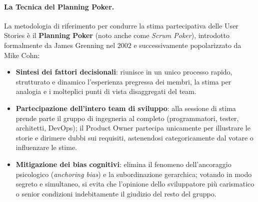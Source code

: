 \documentclass[12pt]{extarticle}
\begin{document}
\paragraph{La Tecnica del Planning Poker.}
La metodologia di riferimento per condurre la stima partecipativa delle User Stories è il \textbf{Planning Poker} (noto anche come \textit{Scrum Poker}), introdotto formalmente da James Grenning nel 2002 e successivamente popolarizzato da Mike Cohn:
\begin{itemize}
    \item \textbf{Sintesi dei fattori decisionali}: riunisce in un unico processo rapido, strutturato e dinamico l'esperienza pregressa dei membri, la stima per analogia e i molteplici punti di vista disaggregati del team.
    \item \textbf{Partecipazione dell'intero team di sviluppo}: alla sessione di stima prende parte il gruppo di ingegneria al completo (programmatori, tester, architetti, DevOps); il Product Owner partecipa unicamente per illustrare le storie e dirimere dubbi sui requisiti, astenendosi categoricamente dal votare o influenzare le stime.
    \item \textbf{Mitigazione dei bias cognitivi}: elimina il fenomeno dell'ancoraggio psicologico (\textit{anchoring bias}) e la subordinazione gerarchica; votando in modo segreto e simultaneo, si evita che l'opinione dello sviluppatore più carismatico o senior condizioni indebitamente il giudizio del resto del gruppo.
\end{itemize}
\end{document}
